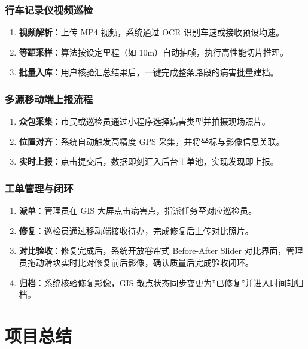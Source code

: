 \documentclass[UTF8, a4paper, fontset=ubuntu]{ctexart}
\begin{document}
\subsubsection{行车记录仪视频巡检}
\begin{enumerate}[label=\arabic*., nosep]
    \item \textbf{视频解析}：上传 MP4 视频，系统通过 OCR 识别车速或接收预设均速。
    \item \textbf{等距采样}：算法按设定里程（如 10m）自动抽帧，执行高性能切片推理。
    \item \textbf{批量入库}：用户核验汇总结果后，一键完成整条路段的病害批量建档。
\end{enumerate}

\subsubsection{多源移动端上报流程}
\begin{enumerate}[label=\arabic*., nosep]
    \item \textbf{众包采集}：市民或巡检员通过小程序选择病害类型并拍摄现场照片。
    \item \textbf{位置对齐}：系统自动触发高精度 GPS 采集，并将坐标与影像信息关联。
    \item \textbf{实时上报}：点击提交后，数据即刻汇入后台工单池，实现发现即上报。
\end{enumerate}

\subsubsection{工单管理与闭环}
\begin{enumerate}[label=\arabic*., nosep]
    \item \textbf{派单}：管理员在 GIS 大屏点击病害点，指派任务至对应巡检员。
    \item \textbf{修复}：巡检员通过移动端接收待办，完成修复后上传对比照片。
    \item \textbf{对比验收}：修复完成后，系统开放卷帘式 Before-After Slider 对比界面，管理员拖动滑块实时比对修复前后影像，确认质量后完成验收闭环。
    \item \textbf{归档}：系统核验修复影像，GIS 散点状态同步变更为”已修复”并进入时间轴归档。
\end{enumerate}

\section{项目总结}
\end{document}
